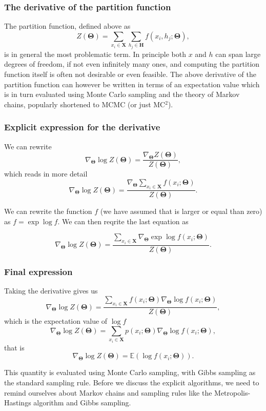 \documentclass{beamer}
\begin{document}
\begin{frame}
\frametitle{The derivative of the partition function}

The partition function, defined above as
\[
Z(\bm{\Theta})=\sum_{x_i\in \bm{X}}\sum_{h_j\in \bm{H}} f(x_i,h_j;\bm{\Theta}),
\]
is in general the most problematic term. In principle both $x$ and $h$ can span large degrees of freedom, if not even infinitely many ones, and computing the partition function itself is often not desirable or even feasible. The above derivative of the partition function can however be written in terms of an expectation value which is in turn evaluated  using Monte Carlo sampling and the theory of Markov chains, popularly shortened to MCMC (or just MC$^2$).
\end{frame}

\begin{frame}
\frametitle{Explicit expression for the derivative}

We can rewrite
\[
\nabla_{\bm{\Theta}}\log{Z(\bm{\Theta})}=\frac{\nabla_{\bm{\Theta}}Z(\bm{\Theta})}{Z(\bm{\Theta})},
\]
which reads in more detail
\[
\nabla_{\bm{\Theta}}\log{Z(\bm{\Theta})}=\frac{\nabla_{\bm{\Theta}} \sum_{x_i\in \bm{X}}f(x_i;\bm{\Theta})   }{Z(\bm{\Theta})}.
\]

We can rewrite the function $f$ (we have assumed that is larger or
equal than zero) as $f=\exp{\log{f}}$. We can then reqrite the last
equation as

\[
\nabla_{\bm{\Theta}}\log{Z(\bm{\Theta})}=\frac{ \sum_{x_i\in \bm{X}} \nabla_{\bm{\Theta}}\exp{\log{f(x_i;\bm{\Theta})}}   }{Z(\bm{\Theta})}.
\]
\end{frame}

\begin{frame}
\frametitle{Final expression}

Taking the derivative gives us
\[
\nabla_{\bm{\Theta}}\log{Z(\bm{\Theta})}=\frac{ \sum_{x_i\in \bm{X}}f(x_i;\bm{\Theta}) \nabla_{\bm{\Theta}}\log{f(x_i;\bm{\Theta})}   }{Z(\bm{\Theta})}, 
\]
which is the expectation value of $\log{f}$
\[
\nabla_{\bm{\Theta}}\log{Z(\bm{\Theta})}=\sum_{x_i\in \bm{X}}p(x_i;\bm{\Theta}) \nabla_{\bm{\Theta}}\log{f(x_i;\bm{\Theta})},
\]
that is
\[
\nabla_{\bm{\Theta}}\log{Z(\bm{\Theta})}=\mathbb{E}(\log{f(x_i;\bm{\Theta})}).
\]

This quantity is evaluated using Monte Carlo sampling, with Gibbs
sampling as the standard sampling rule.  Before we discuss the
explicit algorithms, we need to remind ourselves about Markov chains
and sampling rules like the Metropolis-Hastings algorithm and Gibbs
sampling.
\end{frame}
\end{document}
